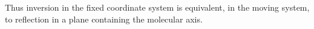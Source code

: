 Thus inversion in the fixed coordinate system is equivalent, in the moving system, to reflection in a plane containing the molecular axis.
